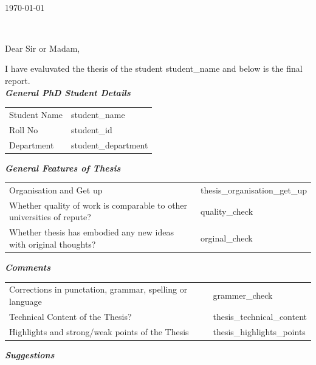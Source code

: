 \documentclass[11pt,a4paper]{letter} %
\def\opening#1{\thispagestyle{empty}
{\centering\fromaddress \vspace{0.6in} \\ %
\hspace*{\longindentation}\today\hspace*{\fill}\par} %
{\raggedright \toname \\ \toaddress \par} %
\vspace{0.4in} %
\noindent #1 %
}
\begin{document}

\begin{letter}
{ }


\opening{Dear Sir or Madam,}

I have evaluvated the thesis of the student {{student_name}} and below is the final report. \\ 

\textbf{\textit{ General PhD Student Details}}
\begin{center}
    \begin{tabular}{  p{5cm}  p{8cm} }
    Student Name & {{student_name}} \\  
    Roll No &  {{student_id}} \\  
    Department &  {{student_department}}\\ 
    \end{tabular}
\end{center} 
\hspace{1.1cm}\textbf{\textit{General Features of Thesis}}
\begin{center}
    \begin{tabular}{  p{5cm}  p{8cm} }
   Organisation and Get up & {{thesis_organisation_get_up}} \\
   Whether quality of work is comparable to other universities of repute? & {{quality_check}} \\
   Whether thesis has embodied any new ideas with original thoughts? & {{orginal_check}} \\
    \end{tabular}
\end{center}
\break
\hspace{1.1cm}\textbf{\textit{Comments}}
\begin{center}
    \begin{tabular}{  p{5cm}  p{8cm} }
   Corrections in punctation, grammar, spelling or language & {{grammer_check}} \\
   Technical Content of the Thesis? & {{thesis_technical_content}} \\
    Highlights and strong/weak points of the Thesis &  {{thesis_highlights_points}}\\
    \end{tabular}
\end{center}
\hspace{1.1cm}\textbf{\textit{Suggestions}}
\begin{center}
     \begin{tabular}{  p{13.5cm}  }
  

\end{tabular}
\end{center}
\end{letter}
\end{document}
